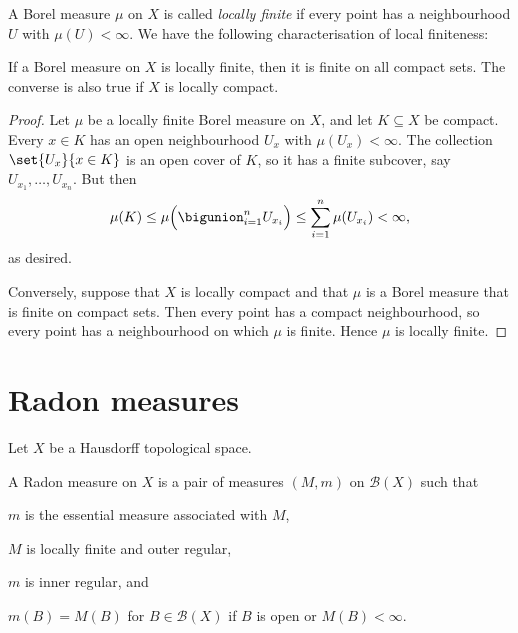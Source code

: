 \documentclass[article, a4paper, 11pt, oneside]{memoir}
\numberwithin{equation}{chapter}
\newcommand{\calB}{\mathcal{B}}
\newcommand{\borel}[1]{\calB(#1)}
\begin{document}
A Borel measure $\mu$ on $X$ is called \emph{locally finite} if every point has a neighbourhood $U$ with $\mu(U) < \infty$. We have the following characterisation of local finiteness:

\begin{proposition}
    If a Borel measure on $X$ is locally finite, then it is finite on all compact sets. The converse is also true if $X$ is locally compact.
\end{proposition}

\begin{proof}
    Let $\mu$ be a locally finite Borel measure on $X$, and let $K \subseteq X$ be compact. Every $x \in K$ has an open neighbourhood $U_x$ with $\mu(U_x) < \infty$. The collection $\set{U_x}{x \in K}$ is an open cover of $K$, so it has a finite subcover, say $U_{x_1}, \ldots, U_{x_n}$. But then
    \begin{equation*}
        \mu(K)
            \leq \mu \Bigl( \bigunion_{i=1}^n U_{x_i} \Bigr)
            \leq \sum_{i=1}^n \mu(U_{x_i})
            < \infty,
    \end{equation*}
    as desired.

    Conversely, suppose that $X$ is locally compact and that $\mu$ is a Borel measure that is finite on compact sets. Then every point has a compact neighbourhood, so every point has a neighbourhood on which $\mu$ is finite. Hence $\mu$ is locally finite.
\end{proof}



\chapter{Radon measures}

Let $X$ be a Hausdorff topological space.

\begin{definition}
    A Radon measure on $X$ is a pair of measures $(M,m)$ on $\borel{X}$ such that
    \begin{enumdef}
        \item $m$ is the essential measure associated with $M$,

        \item $M$ is locally finite and outer regular,

        \item $m$ is inner regular, and

        \item $m(B) = M(B)$ for $B \in \borel{X}$ if $B$ is open or $M(B) < \infty$.
    \end{enumdef}
\end{definition}
\end{document}
